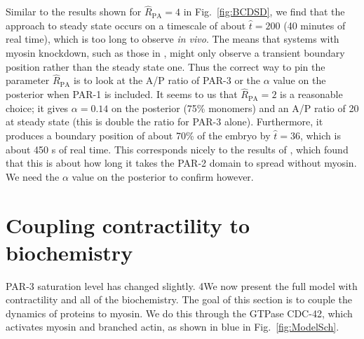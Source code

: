 \documentclass[11pt]{article}
\newcommand{\red}[1]{\color{red}#1\normalcolor}
\newcommand{\6}[1]{#1_{\text{6}}}
\newcommand{\3}[1]{#1_{\text{3}}}
\begin{document}
Similar to the results shown for $\hat R_\text{PA}=4$ in Fig.\ \ref{fig:BCDSD}, we find that the approach to steady state occurs on a timescale of about $\hat t = 200$ (40 minutes of real time), which is too long to observe \emph{in vivo}. The means that systems with myosin knockdown, such as those in \cite{zonies2010symmetry}, might only observe a transient boundary position rather than the steady state one. Thus the correct way to pin the parameter $\hat R_\text{PA}$ is to look at the A/P ratio of PAR-3 or the $\alpha$ value on the posterior when PAR-1 is included. It seems to us that $\hat R_\text{PA}=2$ is a reasonable choice; it gives $\alpha=0.14$ on the posterior (75\% monomers) and an A/P ratio of 20 at steady state (this is double the ratio for PAR-3 alone). Furthermore, it produces a boundary position of about 70\% of the embryo by $\hat t = 36$, which is about 450 s of real time. This corresponds nicely to the results of \cite[Fig.~2c]{gross2019guiding}, which found that this is about how long it takes the PAR-2 domain to spread without myosin. \red{We need the $\alpha$ value on the posterior to confirm however.}

\iffalse
\section{Coupling contractility to biochemistry \label{sec:WithMy}}
\red{PAR-3 saturation level has changed slightly.} 4We now present the full model with contractility and all of the biochemistry. The goal of this section is to couple the dynamics of proteins to myosin. We do this through the GTPase CDC-42, which activates myosin and branched actin, as shown in blue in Fig.~\ref{fig:ModelSch}.
\end{document}
